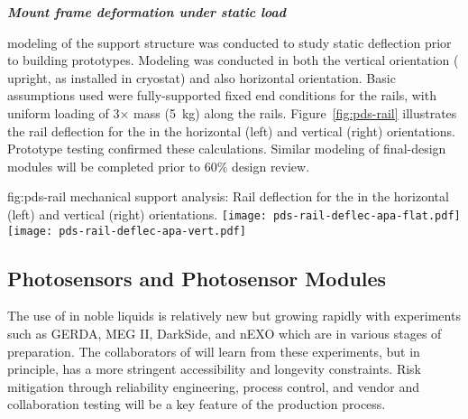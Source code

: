 \textit{\bf {} Mount frame deformation under static  load}


 modeling of the  support structure was conducted to study static deflection prior to building  prototypes.  Modeling was conducted in both the vertical orientation ( upright, as installed in cryostat) and also horizontal orientation.  
Basic assumptions used were fully-supported fixed end conditions for the rails, 
with uniform loading of 3$\times$  mass (\SI{5}{kg}) along the rails.  
Figure~\ref{fig:pds-rail} illustrates the rail deflection for the  in the horizontal (left) and vertical (right) orientations.
Prototype testing confirmed these calculations.  Similar modeling of final-design   modules will be completed prior to 60\% design review.


\begin{dunefigure}{fig:pds-rail}
{ mechanical support analysis: Rail deflection for the  in the horizontal (left) and vertical (right) orientations.}
	\texttt{[image: pds-rail-deflec-apa-flat.pdf]} 
	\texttt{[image: pds-rail-deflec-apa-vert.pdf]}\\
\end{dunefigure}


\subsection{Photosensors and Photosensor Modules}
\label{sec:fdsp-pd-assy-psm}

The use of  in noble liquids is relatively new but growing rapidly with experiments such as GERDA, MEG II, DarkSide, and nEXO which are in various stages of preparation. The collaborators of  will learn from these experiments, but in principle,  has a more stringent accessibility and longevity constraints. Risk mitigation through reliability engineering, process control, and vendor and collaboration testing will be a key feature of the   production process.


